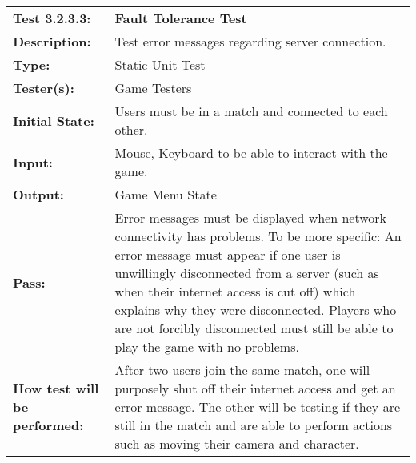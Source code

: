 \documentclass[12pt, titlepage]{article}
\begin{document}
\begin{mdframed}[linewidth=1pt]
\begin{tabularx}{\textwidth}{@{}p{3cm}X@{}}
{\bf Test 3.2.3.3:} & {\bf Fault Tolerance Test}\\[\baselineskip]
{\bf Description:} & Test error messages regarding server connection.\\[0.5\baselineskip]
{\bf Type:} & Static Unit Test\\[0.5\baselineskip]
{\bf Tester(s):} & Game Testers\\[0.5\baselineskip]
{\bf Initial State:} & Users must be in a match and connected to each other.\\[0.5\baselineskip]
{\bf Input:} & Mouse, Keyboard to be able to interact with the game.\\[0.5\baselineskip]
{\bf Output:} & Game Menu State\\[0.5\baselineskip]
{\bf Pass:} & Error messages must be displayed when network connectivity has problems. To be more specific: An error message must appear if one user is unwillingly disconnected from a server (such as when their internet access is cut off) which explains why they were disconnected. Players who are not forcibly disconnected must still be able to play the game with no problems.\\[0.5\baselineskip]
{\bf How test will be performed:} & After two users join the same match, one will purposely shut off their internet access and get an error message. The other will be testing if they are still in the match and are able to perform actions such as moving their camera and character. 
\end{tabularx}
\end{mdframed}

\newpage
\end{document}
